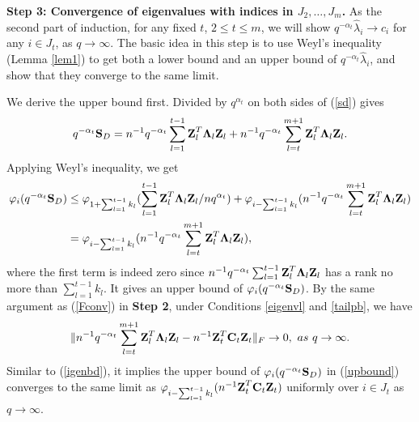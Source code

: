 \documentclass{statsoc}
\newcommand{\bC}{\mbox{\bf C}}
\newcommand{\bS}{\mbox{\bf S}}
\newcommand{\bZ}{\mbox{\bf Z}}
\newcommand{\bLambda}{\mbox{\boldmath $\Lambda$}}
\def\t{^T}
\begin{document}
\medskip

\noindent \textbf{Step 3: Convergence of eigenvalues with indices in $J_2, \dots, J_m$.} As the second part of induction, for any fixed $t$, $2 \leq t \leq m$, we will show $q^{-\alpha_t} \widehat{\lambda}_i \to c_i$ for any $i \in J_t$, as $q \to \infty$. The basic idea in this step is to use Weyl's inequality (Lemma \ref{lem1}) to get both a lower bound and an upper bound of $q^{-\alpha_t} \widehat{\lambda}_i$, and show that they converge to the same limit.

We derive the upper bound first. Divided by $q^{\alpha_t}$ on both sides of (\ref{sd}) gives
\[q^{-\alpha_t}\bS_D = n^{-1}q^{-\alpha_t} \sum_{l = 1}^{t - 1} \bZ_l\t \bLambda_l \bZ_l + n^{-1}q^{-\alpha_t} \sum_{l = t}^{m + 1} \bZ_l\t \bLambda_l \bZ_l.\]
Applying Weyl's inequality, we get
\begin{align}\label{upbound}
\varphi_i(q^{-\alpha_t}\bS_D) &\leq \varphi_{1 + \sum_{l = 1}^{t - 1} k_l}( \sum_{l = 1}^{t - 1} \bZ_l\t \bLambda_l \bZ_l / nq^{\alpha_t}) + \varphi_{i - \sum_{l = 1}^{t - 1} k_l}(n^{-1}q^{-\alpha_t} \sum_{l = t}^{m + 1} \bZ_l\t \bLambda_l \bZ_l) \nonumber\\
&= \varphi_{i - \sum_{l = 1}^{t - 1} k_l}(n^{-1}q^{-\alpha_t} \sum_{l = t}^{m + 1} \bZ_l\t \bLambda_l \bZ_l),
\end{align}
where the first term is indeed zero since $n^{-1}q^{-\alpha_t} \sum_{l = 1}^{t - 1} \bZ_l\t \bLambda_l \bZ_l$ has a rank no more than $\sum_{l = 1}^{t - 1} k_l$. It gives an upper bound of $\varphi_i(q^{-\alpha_t}\bS_D)$. By the same argument as (\ref{Fconv}) in \textbf{Step 2}, under Conditions \ref{eigenvl} and \ref{tailpb}, we have
\[\|n^{-1}q^{-\alpha_t} \sum_{l = t}^{m + 1} \bZ_l\t \bLambda_l \bZ_l - n^{-1} \bZ_t\t \bC_t \bZ_t\|_F \to 0, \ as \ q \to \infty.\]
Similar to (\ref{igenbd}), it implies the upper bound of $\varphi_i(q^{-\alpha_t}\bS_D)$ in (\ref{upbound}) converges to the same limit as $\varphi_{i - \sum_{l = 1}^{t - 1} k_l}(n^{-1}\bZ_t\t\bC_t \bZ_t)$ uniformly over $i \in J_t$ as $q \to \infty$.
\end{document}
